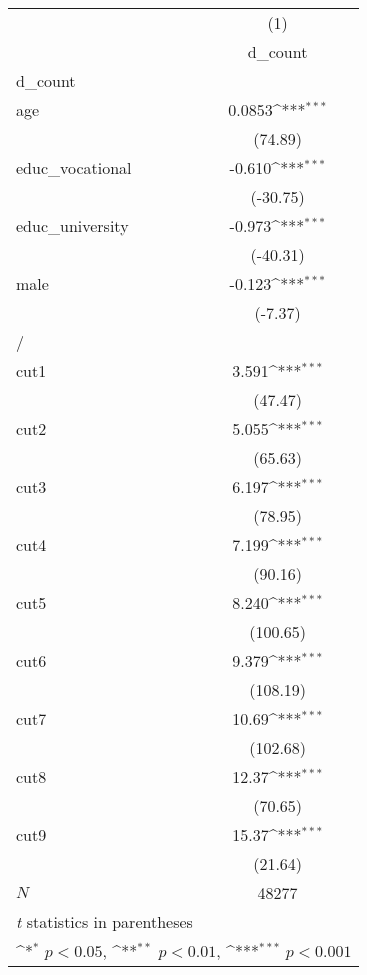 {
\def\sym#1{\ifmmode^{#1}\else\(^{#1}\)\fi}
\begin{tabular}{l*{1}{c}}
\hline\hline
            &\multicolumn{1}{c}{(1)}\\
            &\multicolumn{1}{c}{d\_count}\\
\hline
d\_count     &                     \\
age         &      0.0853\sym{***}\\
            &     (74.89)         \\
[1em]
educ\_vocational&      -0.610\sym{***}\\
            &    (-30.75)         \\
[1em]
educ\_university&      -0.973\sym{***}\\
            &    (-40.31)         \\
[1em]
male        &      -0.123\sym{***}\\
            &     (-7.37)         \\
\hline
/           &                     \\
cut1        &       3.591\sym{***}\\
            &     (47.47)         \\
[1em]
cut2        &       5.055\sym{***}\\
            &     (65.63)         \\
[1em]
cut3        &       6.197\sym{***}\\
            &     (78.95)         \\
[1em]
cut4        &       7.199\sym{***}\\
            &     (90.16)         \\
[1em]
cut5        &       8.240\sym{***}\\
            &    (100.65)         \\
[1em]
cut6        &       9.379\sym{***}\\
            &    (108.19)         \\
[1em]
cut7        &       10.69\sym{***}\\
            &    (102.68)         \\
[1em]
cut8        &       12.37\sym{***}\\
            &     (70.65)         \\
[1em]
cut9        &       15.37\sym{***}\\
            &     (21.64)         \\
\hline
\(N\)       &       48277         \\
\hline\hline
\multicolumn{2}{l}{\footnotesize \textit{t} statistics in parentheses}\\
\multicolumn{2}{l}{\footnotesize \sym{*} \(p<0.05\), \sym{**} \(p<0.01\), \sym{***} \(p<0.001\)}\\
\end{tabular}
}
